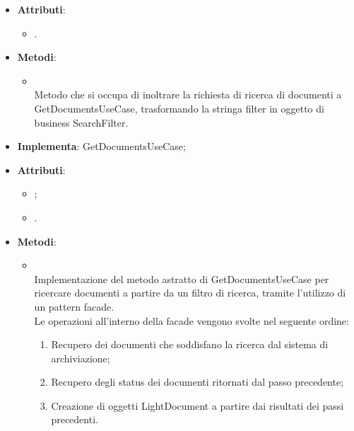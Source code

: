 \documentclass[10pt, a4paper]{article}
\begin{document}
\label{GetDocumentsControllerDettaglio}
\begin{itemize}
    \item \textbf{Attributi}:
    \begin{itemize}
        \item {}.
    \end{itemize}
    \item \textbf{Metodi}:
    \begin{itemize}
        \item {}\\
        Metodo che si occupa di inoltrare la richiesta di ricerca di documenti a GetDocumentsUseCase, trasformando la stringa filter in oggetto di business SearchFilter.
    \end{itemize}
\end{itemize}

\label{GetDocumentsFacadeServiceDettaglio}
\begin{itemize}
    \item \textbf{Implementa}: GetDocumentsUseCase;
    \item \textbf{Attributi}:
    \begin{itemize}
        \item {};
        \item {}.
    \end{itemize}
    \item \textbf{Metodi}:
    \begin{itemize}
        \item {}\\
        Implementazione del metodo astratto di GetDocumentsUseCase per ricercare documenti a partire da un filtro di ricerca, tramite l'utilizzo di un pattern facade.\\
        Le operazioni all'interno della facade vengono svolte nel seguente ordine:
        \begin{enumerate}
            \item Recupero dei documenti che soddisfano la ricerca dal sistema di archiviazione;
            \item Recupero degli status dei documenti ritornati dal passo precedente;
            \item Creazione di oggetti LightDocument a partire dai risultati dei passi precedenti.
        \end{enumerate}
    \end{itemize}
\end{itemize}
\end{document}
